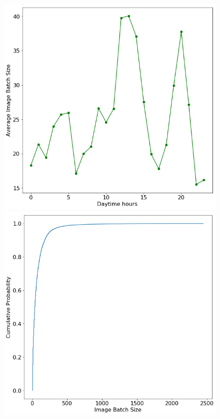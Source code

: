 \begin{figure}
\centering
\begin{minipage}{.4\textwidth}
  \centering
  \includegraphics[width=\linewidth]{figures/Hourly_act.png}
\end{minipage}%
\hspace{0.5in}
\begin{minipage}{.4\textwidth}
  \centering
  \includegraphics[width=\linewidth]{figures/ecdf.png}

\end{minipage}
\end{figure}
